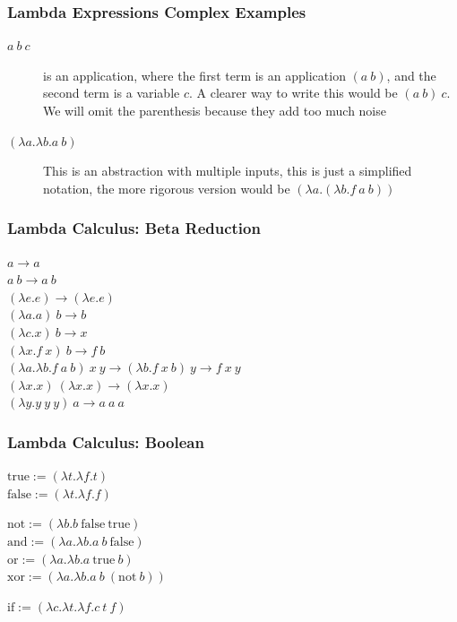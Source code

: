 \documentclass{beamer}
\begin{document}
\begin{frame}[fragile]
  \frametitle{Lambda Expressions Complex Examples}

  \begin{description}
    \item[$ a\ b\ c $] is an application, where the first term is an application $(a\ b)$, and the second term is a variable $c$. A clearer way to write this would be  $(a\ b)\ c$. We will omit the parenthesis because they add too much noise
    \item[$(\lambda a . \lambda b . a\ b) $] This is an abstraction with multiple inputs, this is just a simplified notation, the more rigorous version would be $(\lambda a . (\lambda b . f\ a\ b))$
  \end{description}
\end{frame}

\begin{frame}[fragile]
  \frametitle{Lambda Calculus: Beta Reduction}
  $ a \rightarrow a $ \\
  $ a\ b \rightarrow a\ b$ \\
  \pause
  $ (\lambda e . e) \rightarrow (\lambda e . e) $ \\
  $ (\lambda a . a)\ b \rightarrow b$ \\
  \pause
  $ (\lambda c . x)\ b \rightarrow x$ \\
  $ (\lambda x . f\ x)\ b \rightarrow f\ b$ \\
  $ (\lambda a . \lambda b . f\ a\ b)\ x\ y \rightarrow (\lambda b . f\ x\ b)\ y \rightarrow f\ x\ y$ \\
  $ (\lambda x . x)\ (\lambda x . x) \rightarrow (\lambda x . x) $ \\
  $ (\lambda y . y\ y\ y)\ a \rightarrow a\ a\ a$
\end{frame}

\begin{frame}[fragile]
  \frametitle{Lambda Calculus: Boolean}

  $ \text{true} := (\lambda t . \lambda f . t) $ \\
  $ \text{false} := (\lambda t . \lambda f . f) $ \\

  \vspace{1cm}
  \pause


  $ \text{not} := (\lambda b . b\ \text{false}\ \text{true}) $ \\
  \pause
  $ \text{and} := (\lambda a . \lambda b . a\ b\ \text{false}) $ \\
  \pause
  $ \text{or} := (\lambda a . \lambda b . a\ \text{true}\ b) $ \\
  \pause
  $ \text{xor} := (\lambda a . \lambda b . a\ b\ (\text{not}\ b)) $ \\
  \pause

  $ \text{if} := (\lambda c . \lambda t . \lambda f . c\ t\ f) $ \\
\end{frame}
\end{document}
